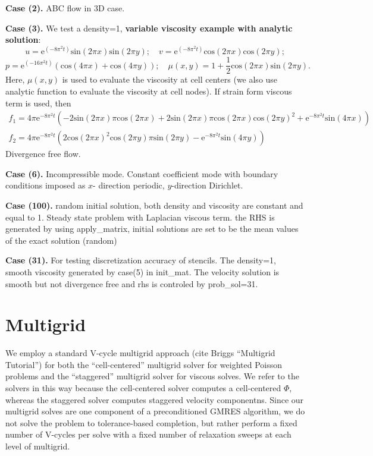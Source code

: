 \documentclass[final]{siamltex}
\begin{document}
{\bf Case (2).} ABC flow in 3D case. 

{\bf Case (3).} We test a density=1, {\bf variable viscosity example with analytic solution}: %
$$
u=\mbox{e}^{(-8\pi^2t)}\mbox{sin}(2 \pi x)\mbox{sin}(2 \pi y); \quad v=\mbox{e}^{(-8\pi^2t)}\mbox{cos}(2 \pi x)\mbox{cos}(2 \pi y);
$$
$$
p=\mbox{e}^{(-16 \pi^2 t)}(\mbox{cos}(4 \pi x)+\mbox{cos}(4 \pi y));
\quad
\mu(x,y)=1+\frac{1}{2} \mbox{cos}(2 \pi x) \mbox{sin}(2 \pi y).
$$
Here, $\mu(x,y)$ is used to evaluate the viscosity at cell centers (we also use analytic function to evaluate the viscosity at cell nodes).
If strain form viscous term is used, then 
$$
\begin{array} {ll}
f_1=4 \pi \mbox{e}^{-8 \pi^2 t} (-2 \mbox{sin}(2 \pi x) \pi \mbox{cos}(2 \pi x)+2 \mbox{sin}(2 \pi x) \pi \mbox{cos}(2 \pi x) \mbox{cos}(2 \pi y)^2+\mbox{e}^{-8 \pi^2 t} \mbox{sin}(4 \pi x))
\\
f_2=4 \pi \mbox{e}^{-8 \pi^2 t} (2 \mbox{cos}(2 \pi x)^2 \mbox{cos}(2 \pi y) \pi \mbox{sin}(2 \pi y)-\mbox{e}^{-8 \pi^2 t} \mbox{sin}(4 \pi y))
\end{array}
$$
Divergence free flow.

{\bf Case (6).} Incompressible mode. Constant coefficient mode with boundary conditions imposed as $x$- direction periodic, $y$-direction Dirichlet.


{\bf Case (100).} random initial solution, both density and viscosity are constant and equal to 1. Steady state problem with Laplacian viscous term.
the RHS is generated by using apply\_matrix, initial solutions are set to be the mean values of the exact solution (random) 


{\bf Case (31).} For testing discretization accuracy of stencils. The density=1, smooth viscosity generated by case(5) in init\_mat. 
The velocity solution is smooth but not divergence free and rhs is controled by prob\_sol=31. 

\section{Multigrid}
We employ a standard V-cycle multigrid approach (cite Briggs ``Multigrid Tutorial'') for
both the ``cell-centered'' multigrid solver for weighted Poisson problems and the
``staggered'' multigrid solver for viscous solves.  We refer to the solvers in this
way because the cell-centered solver computes a cell-centered $\Phi$, whereas the
staggered solver computes staggered velocity componentns.
Since our multigrid solves are one component of a preconditioned
GMRES algorithm, we do not solve the problem to tolerance-based completion, 
but rather perform a fixed number of V-cycles per solve with a fixed number of
relaxation sweeps at each level of multigrid.
\end{document}
